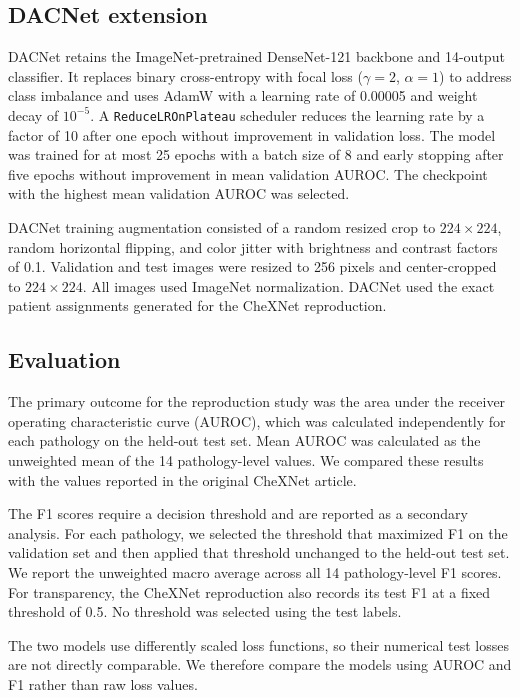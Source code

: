 \subsection{DACNet extension}

DACNet retains the ImageNet-pretrained DenseNet-121 backbone and 14-output
classifier. It replaces binary cross-entropy with focal loss
($\gamma=2$, $\alpha=1$) to address class imbalance and uses AdamW with a
learning rate of 0.00005 and weight decay of $10^{-5}$. A
\texttt{ReduceLROnPlateau} scheduler reduces the learning rate by a factor of
10 after one epoch without improvement in validation loss. The model was
trained for at most 25 epochs with a batch size of 8 and early stopping after
five epochs without improvement in mean validation AUROC. The checkpoint with
the highest mean validation AUROC was selected.

DACNet training augmentation consisted of a random resized crop to
$224\times224$, random horizontal flipping, and color jitter with brightness
and contrast factors of 0.1. Validation and test images were resized to 256
pixels and center-cropped to $224\times224$. All images used ImageNet
normalization. DACNet used the exact patient assignments generated for the
CheXNet reproduction.

\subsection{Evaluation}

The primary outcome for the reproduction study was the area under the receiver operating 
characteristic curve (AUROC), which was calculated independently for each pathology 
on the held-out test set. Mean AUROC was calculated as the unweighted mean of the 14 pathology-level 
values. We compared these results with the values reported in the original CheXNet article.

The F1 scores require a decision threshold and are reported as a secondary analysis. For
each pathology, we selected the threshold that maximized F1 on the validation
set and then applied that threshold unchanged to the held-out test set. We
report the unweighted macro average across all 14 pathology-level F1 scores.
For transparency, the CheXNet reproduction also records its test F1 at a fixed
threshold of 0.5. No threshold was selected using the test labels.

The two models use differently scaled loss functions, so their numerical test
losses are not directly comparable. We therefore compare the models using
AUROC and F1 rather than raw loss values.

